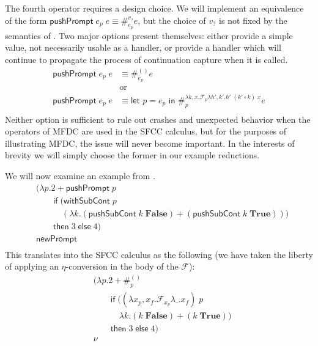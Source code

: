 \documentclass[11pt]{article}
\newcommand{\letin}[2]{\textsf{let }#1\textsf{ in }#2}
\newcommand\F{\mathcal{F}}
\begin{document}
The fourth operator requires a design choice.
We will implement an equivalence of the form $\mathsf{pushPrompt}\;e_p\;e \equiv \#_{e_p}^{v_?}e$, but the choice of $v_?$ is not fixed by the semantics of \cite{MFDC}.
Two major options present themselves:
either provide a simple value, not necessarily usable as a handler,
or provide a handler which will continue to propagate the process of continuation capture when it is called.
\begin{align*}
\mathsf{pushPrompt}\;e_p\;e &\equiv \#_{e_p}^{()}e \\
&\textrm{or} \\
\mathsf{pushPrompt}\;e_p\;e &\equiv
    \letin{p=e_p}\#_{p}^{\lambda k,x.\F_{p}\lambda h',k'.h'\;(k' \circ k)\;x}e \\
\end{align*}
Neither option is sufficient to rule out crashes and unexpected behavior when the operators of MFDC are used in the SFCC calculus, but for the purposes of illustrating MFDC, the issue will never become important.
In the interests of brevity we will simply choose the former in our example reductions.

We will now examine an example from \cite{MFDC}.
\begin{align*}
&(\lambda p. 2 + \mathsf{pushPrompt}\;p \\
&\qquad \mathsf{if}\;(\mathsf{withSubCont}\;p \\
&\qquad\quad (\lambda k. (\mathsf{pushSubCont}\;k\;\mathbf{False}) +
            (\mathsf{pushSubCont}\;k\;\mathbf{True}))) \\
&\qquad \mathsf{then}\;3\;\mathsf{else}\;4) \\
&\mathsf{newPrompt} \\
\end{align*}
This translates into the SFCC calculus as the following (we have taken the liberty of applying an $\eta$-conversion in the body of the $\F$):
\begin{align*}
&(\lambda p. 2 + \#_p^{()} \\
&\qquad \mathsf{if}\;((\lambda x_p,x_f. \F_{x_p}\lambda \_.x_f)\;p \\
&\qquad\quad \lambda k. (k\;\mathbf{False}) +
            (k\;\mathbf{True})) \\
&\qquad \mathsf{then}\;3\;\mathsf{else}\;4) \\
&\nu \\
\end{align*}
\end{document}
